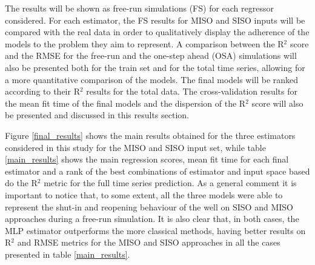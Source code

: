 \documentclass[conference]{IEEEtran}
\begin{document}
The results will be shown as free-run simulations (FS) for each regressor considered. For each estimator, the FS results for MISO and SISO inputs will be compared with the real data in order to qualitatively display the adherence of the models to the problem they aim to represent. A comparison between the R$^2$ score and the RMSE for the free-run and the one-step ahead (OSA) simulations will also be presented both for the train set and for the total time series, allowing for a more quantitative comparison of the models. The final models will be ranked according to their R$^2$ results for the total data. The cross-validation results for the mean fit time of the final models and the dispersion of the R$^2$ score will also be presented and discussed in this results section.

Figure \ref{final_results} shows the main results obtained for the three estimators considered in this study for the MISO and SISO input set, while table \ref{main_results} shows the main regression scores, mean fit time for each final estimator and a rank of the best combinations of estimator and input space based do the R$^2$ metric for the full time series prediction. As a general comment it is important to notice that, to some extent, all the three models were able to represent the shut-in and reopening behaviour of the well on SISO and MISO approaches during a free-run simulation. It is also clear that, in both cases, the MLP estimator outperforms the more classical methods, having better results on R$^2$ and RMSE metrics for the MISO and SISO approaches in all the cases presented in table \ref{main_results}.
\end{document}

